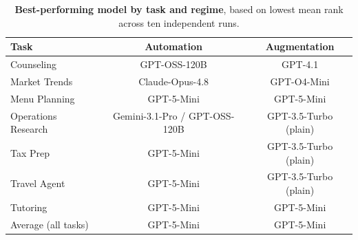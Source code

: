 \begin{table}[htbp]
    \centering
    \caption{\textbf{Best-performing model by task and regime}, based on lowest mean rank across ten independent runs.}
    \label{tab:best-model-by-task}
    \small
    \begin{tabular}{lcc}
        \toprule
        Task & Automation & Augmentation \\
        \midrule
        Counseling & GPT-OSS-120B & GPT-4.1 \\
        Market Trends & Claude-Opus-4.8 & GPT-O4-Mini \\
        Menu Planning & GPT-5-Mini & GPT-5-Mini \\
        Operations Research & Gemini-3.1-Pro / GPT-OSS-120B & GPT-3.5-Turbo (plain) \\
        Tax Prep & GPT-5-Mini & GPT-3.5-Turbo (plain) \\
        Travel Agent & GPT-5-Mini & GPT-3.5-Turbo (plain) \\
        Tutoring & GPT-5-Mini & GPT-5-Mini \\
        Average (all tasks) & GPT-5-Mini & GPT-5-Mini \\
        \bottomrule
    \end{tabular}
\end{table}
